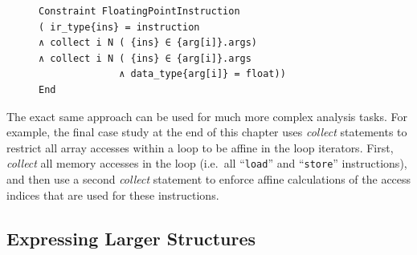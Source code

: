 \begin{figure}[H]
\begin{lstlisting}[language=CAnDL,label={fig:collectexample},caption=
   {{\it Collect} restricts ``{\tt ins}'' to be an instruction with only
    from floating-point operands.\leftskip=0pt\rightskip=0pt}]
Constraint FloatingPointInstruction
( ir_type{ins} = instruction
∧ collect i N ( {ins} ∈ {arg[i]}.args)
∧ collect i N ( {ins} ∈ {arg[i]}.args
              ∧ data_type{arg[i]} = float))
End
\end{lstlisting}
\end{figure}

    The exact same approach can be used for much more complex analysis tasks.
    For example, the final case study at the end of this chapter uses
    {\it collect} statements to restrict all array accesses within a
    loop to be affine in the loop iterators.
    First, {\it collect} all memory accesses in the loop
    (i.e.\ all ``\texttt{load}'' and ``\texttt{store}'' instructions), and then
    use a second {\it collect} statement to enforce affine calculations of the
    access indices that are used for these instructions.

\subsection{Expressing Larger Structures}

